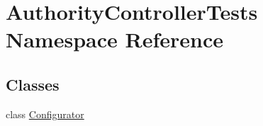 \hypertarget{namespace_authority_controller_tests}{}\section{Authority\+Controller\+Tests Namespace Reference}
\label{namespace_authority_controller_tests}
\subsection*{Classes}
\begin{DoxyCompactItemize}
\item 
class \mbox{\hyperlink{class_authority_controller_tests_1_1_configurator}{Configurator}}
\end{DoxyCompactItemize}
